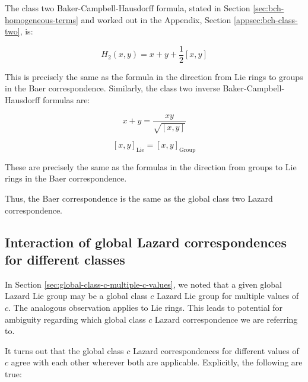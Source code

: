\documentclass{ucetd}
\begin{document}
The class two Baker-Campbell-Hausdorff formula, stated in Section
\ref{sec:bch-homogeneous-terms} and worked out in the Appendix,
Section \ref{appsec:bch-class-two}, is:

$$H_2(x,y) = x + y + \frac{1}{2}[x,y]$$

This is precisely the same as the formula in the direction from Lie
rings to groups in the Baer correspondence. Similarly, the class two
inverse Baker-Campbell-Hausdorff formulas are:

$$x + y = \frac{xy}{\sqrt{[x,y]}}$$

$$[x,y]_{\text{Lie}} = [x,y]_{\text{Group}}$$

These are precisely the same as the formulas in the direction from
groups to Lie rings in the Baer correspondence.

Thus, the Baer correspondence is the same as the global class two
Lazard correspondence.

\subsection{Interaction of global Lazard correspondences for different classes}

In Section \ref{sec:global-class-c-multiple-c-values}, we noted that a
given global Lazard Lie group may be a global class $c$ Lazard Lie
group for multiple values of $c$. The analogous observation applies to
Lie rings. This leads to potential for ambiguity regarding which
global class $c$ Lazard correspondence we are referring to.

It turns out that the global class $c$ Lazard correspondences for
different values of $c$ agree with each other wherever both are
applicable. Explicitly, the following are true:
\end{document}
